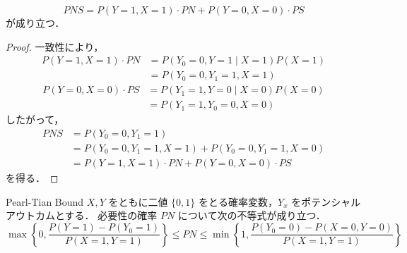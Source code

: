 \documentclass[uplatex, dvipdfmx]{jsarticle}
\begin{document}
\begin{prop}{}
  \begin{equation}
    PNS = P(Y=1, X=1) \cdot PN + P(Y=0, X=0) \cdot PS
  \end{equation}
  が成り立つ．
\end{prop}

\begin{proof}
  一致性により，
  \begin{align}
    P(Y=1, X=1) \cdot PN &= P(Y_0=0, Y=1 \mid X=1) P(X=1) \\
    &= P(Y_0=0, Y_1=1, X=1)
  \end{align}
  \begin{align}
    P(Y=0, X=0) \cdot PS &= P(Y_1=1, Y=0 \mid X=0) P(X=0) \\
    &= P(Y_1=1, Y_0=0, X=0)
  \end{align}
  したがって，
  \begin{align}
    PNS &= P(Y_0=0, Y_1=1) \\
    &= P(Y_0=0, Y_1=1, X=1) + P(Y_0=0, Y_1=1, X=0) \\
    &= P(Y=1, X=1) \cdot PN + P(Y=0, X=0) \cdot PS
  \end{align}
  を得る．
\end{proof}

\begin{prop}[label={prop:Pearl-Tian}]{Pearl-Tian Bound}
  $X, Y$ をともに二値 $\{0, 1\}$ をとる確率変数，$Y_x$ をポテンシャルアウトカムとする．
  必要性の確率 $PN$ について次の不等式が成り立つ．
  \begin{equation}
    \max \left\{ 0, \frac{P(Y=1) - P(Y_0=1)}{P(X=1, Y=1)} \right\} \leq PN \leq \min \left\{ 1, \frac{P(Y_0=0) - P(X=0, Y=0)}{P(X=1, Y=1)} \right\}
  \end{equation}
\end{prop}
\end{document}
